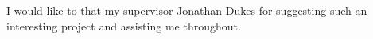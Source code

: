 \begin{thesisacknowledgments}
I would like to that my supervisor Jonathan Dukes for suggesting such an interesting
project and assisting me throughout.

\end{thesisacknowledgments}
